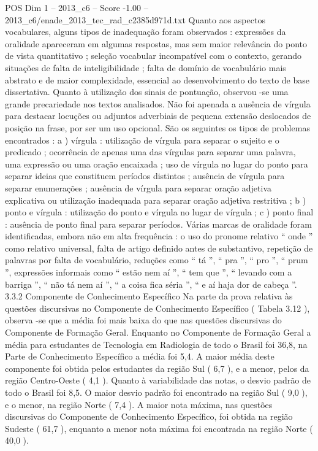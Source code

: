\begin{textsample}{POS Dim 1 – 2013\_c6 – Score -1.00 – 2013\_c6/enade\_2013\_tec\_rad\_c2385d971d.txt}
Quanto aos aspectos vocabulares, alguns tipos de inadequação foram observados : expressões da oralidade apareceram em algumas respostas, mas sem maior relevância do ponto de vista quantitativo ; seleção vocabular incompatível com o contexto, gerando situações de falta de inteligibilidade ; falta de domínio de vocabulário mais abstrato e de maior complexidade, essencial ao desenvolvimento do texto de base dissertativa.
Quanto à utilização dos sinais de pontuação, observou -se uma grande precariedade nos textos analisados.
Não foi apenada a ausência de vírgula para destacar locuções ou adjuntos adverbiais de pequena extensão deslocados de posição na frase, por ser um uso opcional.
São os seguintes os tipos de problemas encontrados : a ) vírgula : utilização de vírgula para separar o sujeito e o predicado ; ocorrência de apenas uma das vírgulas para separar uma palavra, uma expressão ou uma oração encaixada ; uso de vírgula no lugar do ponto para separar ideias que constituem períodos distintos ; ausência de vírgula para separar enumerações ; ausência de vírgula para separar oração adjetiva explicativa ou utilização inadequada para separar oração adjetiva restritiva ; b ) ponto e vírgula : utilização do ponto e vírgula no lugar de vírgula ; c ) ponto final : ausência de ponto final para separar períodos.
Várias marcas de oralidade foram identificadas, embora não em alta frequência : o uso do pronome relativo “ onde ” como relativo universal, falta de artigo definido antes de substantivo, repetição de palavras por falta de vocabulário, reduções como “ tá ”, “ pra ”, “ pro ”, “ prum ”, expressões informais como “ estão nem aí ”, “ tem que ”, “ levando com a barriga ”, “ não tá nem aí ”, “ a coisa fica séria ”, “ e aí haja dor de cabeça ”. 3.3.2 Componente de Conhecimento Específico Na parte da prova relativa às questões discursivas no Componente de Conhecimento Específico ( Tabela 3.12 ), observa -se que a média foi mais baixa do que nas questões discursivas do Componente de Formação Geral.
Enquanto no Componente de Formação Geral a média para estudantes de Tecnologia em Radiologia de todo o Brasil foi 36,8, na Parte de Conhecimento Específico a média foi 5,4.
A maior média deste componente foi obtida pelos estudantes da região Sul ( 6,7 ), e a menor, pelos da região Centro-Oeste ( 4,1 ).
Quanto à variabilidade das notas, o desvio padrão de todo o Brasil foi 8,5.
O maior desvio padrão foi encontrado na região Sul ( 9,0 ), e o menor, na região Norte ( 7,4 ).
A maior nota máxima, nas questões discursivas do Componente de Conhecimento Específico, foi obtida na região Sudeste ( 61,7 ), enquanto a menor nota máxima foi encontrada na região Norte ( 40,0 ).

\end{textsample}
